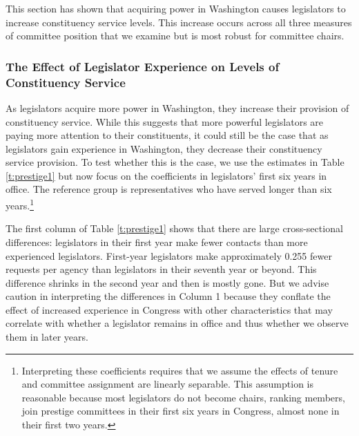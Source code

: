 \documentclass[12pt]{article}
\begin{document}
This section has shown that acquiring power in Washington causes legislators to increase constituency service levels. This increase occurs across all three measures of committee position that we examine but is most robust for committee chairs. 


\subsubsection{The Effect of Legislator Experience on Levels of Constituency Service}\label{s:tenure} 

As legislators acquire more power in Washington, they increase their provision of constituency service. While this suggests that more powerful legislators are paying more attention to their constituents, it could still be the case that as legislators gain experience in Washington, they decrease their constituency service provision. To test whether this is the case, we use the estimates in Table \ref{t:prestige1} but now focus on the coefficients in legislators' first six years in office. The reference group is representatives who have served longer than six years.\footnote{Interpreting these coefficients requires that we assume the effects of tenure and committee assignment are linearly separable. This assumption is reasonable because most legislators do not become chairs, ranking members, join prestige committees in their first six years in Congress, almost none in their first two years.} 


The first column of Table \ref{t:prestige1} shows that there are large cross-sectional differences: legislators in their first year make fewer contacts than more experienced legislators. First-year legislators make approximately 0.255 fewer requests per agency than legislators in their seventh year or beyond. This difference shrinks in the second year and then is mostly gone. But we advise caution in interpreting the differences in Column 1 because they conflate the effect of increased experience in Congress with other characteristics that may correlate with whether a legislator remains in office and thus whether we observe them in later years.   



\end{document}
